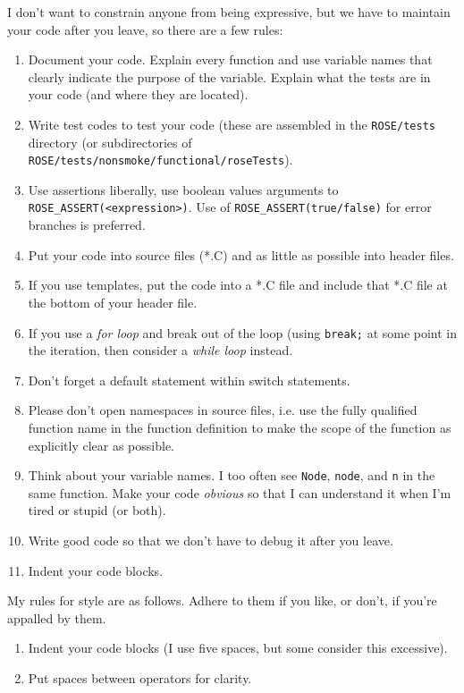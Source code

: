    I don't want to constrain anyone from being expressive, but
we have to maintain your code after you leave, so there are a few rules:
\begin{enumerate}
   \item Document your code.
         Explain every function and use variable names that clearly indicate the purpose of
         the variable. Explain what the tests are in your code (and where they are located).
   \item Write test codes to test your code (these are assembled in the {\tt ROSE/tests}
         directory (or subdirectories of {\tt ROSE/tests/nonsmoke/functional/roseTests}).
   \item Use assertions liberally, use boolean values arguments to 
         {\tt ROSE\_ASSERT(<expression>)}. Use of {\tt ROSE\_ASSERT(true/false)} for
         error branches is preferred.
   \item Put your code into source files (*.C) and as little as possible into header files.
   \item If you use templates, put the code into a *.C file and include that *.C file
         at the bottom of your header file.
   \item If you use a {\em for loop} and break out of the loop (using {\tt break;} 
         at some point in the iteration, then consider a {\em while loop} instead.
   \item Don't forget a default statement within switch statements.
   \item Please don't open namespaces in source files, i.e. use the fully qualified
         function name in the function definition to make the scope of the function
         as explicitly clear as possible.
   \item Think about your variable names. I too often see {\tt Node}, {\tt node}, 
         and {\tt n} in the same function.  Make your code {\em obvious} so that I 
         can understand it when I'm tired or stupid (or both).
   \item Write good code so that we don't have to debug it after you leave.
   \item Indent your code blocks.
\end{enumerate}

My rules for style are as follows. Adhere to them if you like, or don't, if you're
    appalled by them.
\begin{enumerate}
   \item Indent your code blocks (I use five spaces, but some consider this excessive).
   \item Put spaces between operators for clarity.
\end{enumerate}

